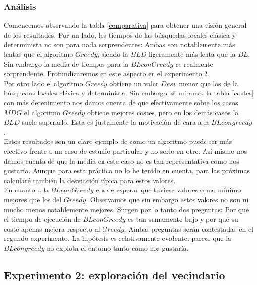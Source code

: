 \documentclass[11pt,a4paper]{article}
\begin{document}
	\subsubsection{ Análisis }
	
	Comencemos observando la tabla \ref{comparativa} para obtener una visión general de los resultados. Por un lado, los tiempos de las búsquedas locales clásica y determinista no son para nada sorprendentes: Ambas son notablemente más lentas que el algoritmo $Greedy$, siendo la $BLD$ ligeramente más lenta que la $BL$. Sin embargo la media de tiempos para la $BL con Greedy$ es realmente sorprendente. Profundizaremos en este aspecto en el experimento 2.  \\
	
	Por otro lado el algoritmo $Greedy$ obtiene un valor $Desv$ menor que los de la búsquedas locales clásica y determinista. Sin embargo, si miramos la tabla \ref{costes} con más detenimiento nos damos cuenta de que efectivamente sobre los casos $MDG$ el algoritmo $Greedy$ obtiene mejores costes, pero en los demás casos la $BLD$ suele superarlo. Esta es justamente la motivación de cara a la $BL con greedy$. \\
	
	 Estos resultados son un claro ejemplo de como un algoritmo puede ser más efectivo frente a un caso de estudio particular y no serlo en otro. Así mismo nos damos cuenta de que la media en este caso no es tan representativa como nos gustaría. Aunque para esta práctica no lo he tenido en cuenta, para las próximas calcularé también la desviación típica para estos valores. \\ 
	
	En cuanto a la $BL con Greedy$ era de esperar que tuviese valores como mínimo mejores que los del $Greedy$. Observamos que sin embargo estos valores no son ni mucho menos notablemente mejores. Surgen por lo tanto dos preguntas: Por qué el tiempo de ejecución de $BL con Greedy$ es tan sumamente bajo y por qué su coste apenas mejora respecto al $Greedy$. Ambas preguntas serán contestadas en el segundo experimento. La hipótesis es relativamente evidente: parece que la $BL con greedy$ no explota el entorno tanto como nos gustaría. \\
	
	\subsection{ Experimento 2: exploración del vecindario }
	
\end{document}
